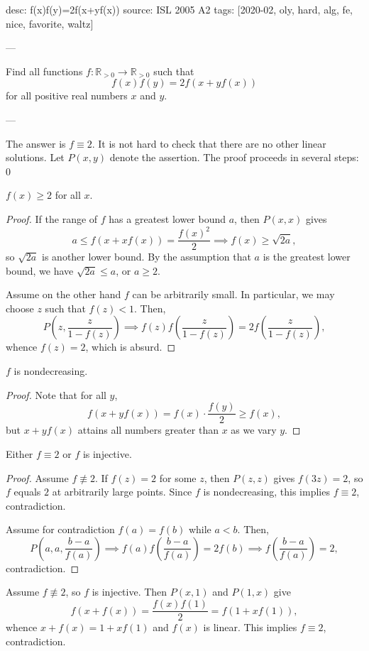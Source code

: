 desc: f(x)f(y)=2f(x+yf(x))
source: ISL 2005 A2
tags: [2020-02, oly, hard, alg, fe, nice, favorite, waltz]

---

Find all functions $f:\mathbb R_{>0}\to\mathbb R_{>0}$ such that \[f(x)f(y)=2f(x+yf(x))\]
for all positive real numbers $x$ and $y$.

---

The answer is $f\equiv2$. It is not hard to check that there are no other linear solutions. Let $P(x,y)$ denote the assertion. The proof proceeds in several steps:
\setcounter{claim}0
\begin{claim}
    $f(x)\ge2$ for all $x$.
\end{claim}
\begin{proof}
    If the range of $f$ has a greatest lower bound $a$, then $P(x,x)$ gives \[a\le f(x+xf(x))=\frac{f(x)^2}2\implies f(x)\ge\sqrt{2a},\]
    so $\sqrt{2a}$ is another lower bound. By the assumption that $a$ is the greatest lower bound, we have $\sqrt{2a}\le a$, or $a\ge2$.

    Assume on the other hand $f$ can be arbitrarily small. In particular, we may choose $z$ such that $f(z)<1$. Then, \[P\left(z,\frac z{1-f(z)}\right)\implies f(z)f\left(\frac z{1-f(z)}\right)=2f\left(\frac z{1-f(z)}\right),\]
    whence $f(z)=2$, which is absurd.
\end{proof}
\begin{claim}
    $f$ is nondecreasing.
\end{claim}
\begin{proof}
    Note that for all $y$, \[f(x+yf(x))=f(x)\cdot\frac{f(y)}2\ge f(x),\]
    but $x+yf(x)$ attains all numbers greater than $x$ as we vary $y$.
\end{proof}
\begin{claim}
    Either $f\equiv2$ or $f$ is injective.
\end{claim}
\begin{proof}
    Assume $f\not\equiv2$. If $f(z)=2$ for some $z$, then $P(z,z)$ gives $f(3z)=2$, so $f$ equals $2$ at arbitrarily large points. Since $f$ is nondecreasing, this implies $f\equiv2$, contradiction.

    Assume for contradiction $f(a)=f(b)$ while $a<b$. Then, \[P\left(a,a,\frac{b-a}{f(a)}\right)\implies f(a)f\left(\frac{b-a}{f(a)}\right)=2f(b)\implies f\left(\frac{b-a}{f(a)}\right)=2,\]
    contradiction.
\end{proof}

Assume $f\not\equiv2$, so $f$ is injective. Then $P(x,1)$ and $P(1,x)$ give \[f(x+f(x))=\frac{f(x)f(1)}2=f(1+xf(1)),\]
whence $x+f(x)=1+xf(1)$ and $f(x)$ is linear. This implies $f\equiv2$, contradiction.
